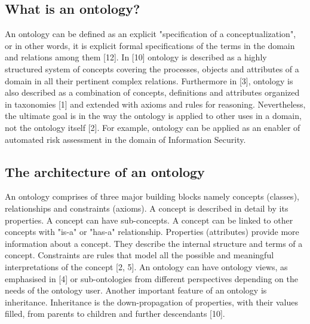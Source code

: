 \documentclass[conference, compsoc]{IEEEtran}
\begin{document}
\subsection{What is an ontology?}
An ontology can be defined as an explicit "specification of a conceptualization", or in other words, it is explicit formal specifications of the terms in the domain and relations among them [12]. In [10] ontology is described as a highly structured system of concepts covering the processes, objects and attributes of a domain in all their pertinent complex relations. Furthermore in [3], ontology is also described as a combination of concepts, definitions and attributes organized in taxonomies [1] and extended with axioms and rules for reasoning. Nevertheless, the ultimate goal is in the way the ontology is applied to other uses in a domain, not the ontology itself [2]. For example, ontology can be applied as an enabler of automated risk assessment in the domain of Information Security. 


\subsection{The architecture of an ontology}
An ontology comprises of three major building blocks namely concepts (classes), relationships and constraints (axioms). A concept is described in detail by its properties. A concept can have sub-concepts. A concept can be linked to other concepts with "is-a" or "has-a" relationship. Properties (attributes) provide more information about a concept. They describe the internal structure and terms of a concept. Constraints are rules that model all the possible and meaningful interpretations of the concept [2, 5]. An ontology can have ontology views, as emphasised in [4] or sub-ontologies from different perspectives depending on the needs of the ontology user. Another important feature of an ontology is inheritance. Inheritance is the down-propagation of properties, with their values filled, from parents to children and further descendants [10].
\end{document}
